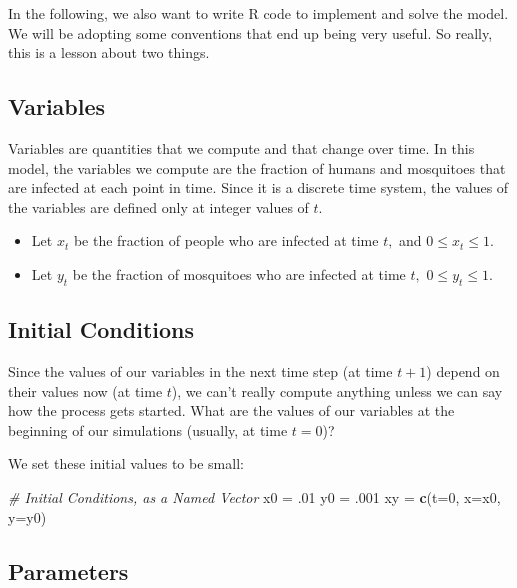 \documentclass[
]{book}
\newenvironment{Shaded}{\begin{snugshade}}{\end{snugshade}}
\newcommand{\AttributeTok}[1]{\textcolor[rgb]{0.13,0.29,0.53}{#1}}
\newcommand{\CommentTok}[1]{\textcolor[rgb]{0.56,0.35,0.01}{\textit{#1}}}
\newcommand{\DecValTok}[1]{\textcolor[rgb]{0.00,0.00,0.81}{#1}}
\newcommand{\FunctionTok}[1]{\textcolor[rgb]{0.13,0.29,0.53}{\textbf{#1}}}
\newcommand{\NormalTok}[1]{#1}
\newcommand{\OtherTok}[1]{\textcolor[rgb]{0.56,0.35,0.01}{#1}}
\begin{document}
In the following, we also want to write R code to implement and solve the model. We will be adopting some conventions that end up being very useful. So really, this is a lesson about two things.

\subsection{Variables}\label{variables}

Variables are quantities that we compute and that change over time. In this model, the variables we compute are the fraction of humans and mosquitoes that are infected at each point in time. Since it is a discrete time system, the values of the variables are defined only at integer values of \(t.\)

\begin{itemize}
\item
  Let \(x_t\) be the fraction of people who are infected at time \(t,\) and \(0 \leq x_t \leq 1.\)
\item
  Let \(y_t\) be the fraction of mosquitoes who are infected at time \(t,\) \(0 \leq y_t \leq 1.\)
\end{itemize}

\subsection{Initial Conditions}\label{initial-conditions}

Since the values of our variables in the next time step (at time \(t+1\)) depend on their values now (at time \(t\)), we can't really compute anything unless we can say how the process gets started. What are the values of our variables at the beginning of our simulations (usually, at time \(t=0\))?

We set these initial values to be small:

\begin{Shaded}
\begin{Highlighting}[]
\CommentTok{\# Initial Conditions, as a Named Vector}
\NormalTok{x0 }\OtherTok{=}\NormalTok{ .}\DecValTok{01}
\NormalTok{y0 }\OtherTok{=}\NormalTok{ .}\DecValTok{001}
\NormalTok{xy }\OtherTok{=} \FunctionTok{c}\NormalTok{(}\AttributeTok{t=}\DecValTok{0}\NormalTok{, }\AttributeTok{x=}\NormalTok{x0, }\AttributeTok{y=}\NormalTok{y0)}
\end{Highlighting}
\end{Shaded}

\subsection{Parameters}\label{parameters}
\end{document}
